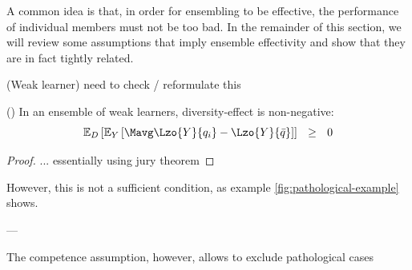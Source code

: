 \documentclass[../main.tex]{subfiles}
\begin{document}

A common idea is that, in order for ensembling to be effective, the performance of individual members must not be too bad. In the remainder of this section, we will review some assumptions that imply ensemble effectivity and show that they are in fact tightly related.

\begin{definition} 
   \label{def:weak-learner}  (Weak learner)
    need to check / reformulate this
\end{definition}

\begin{theorem} 
    \label{thm:weak-learner-ensembles-nonnegative}
    (\cite{wood23}) In an ensemble of weak learners, diversity-effect is non-negative:
$$
\mathbb{E}_{D}\left[ 
\mathbb{E}_{Y}\left[ 
\Mavg \Lzo{Y}{q_{i}} - \Lzo{Y}{\bar{q}}
\right] 
\right] 
~ ~ \geq ~ ~ 0
$$
\end{theorem}
\begin{proof}
... essentially using jury theorem
\end{proof}


However, this is not a sufficient 
condition, as example \ref{fig:pathological-example} shows.
%


---

 The competence assumption, however, allows to exclude pathological cases 
 
\end{document}
